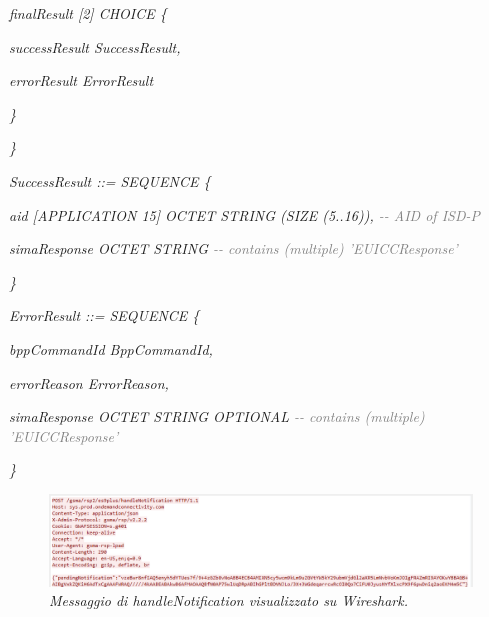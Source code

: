 \documentclass[10pt, oneside]{book}
\begin{document}
\hspace{0.75cm} \textit{finalResult [2] CHOICE \{}

\hspace{1.5cm} \textit{successResult SuccessResult,}

\hspace{1.5cm} \textit{errorResult ErrorResult}

\hspace{0.75cm} \textit{\}}

\textit{\}\\}

\textit{SuccessResult ::= SEQUENCE \{}

\hspace{0.75cm} \textit{aid [APPLICATION 15] OCTET STRING (SIZE (5..16)), \textcolor{gray}{{-}{-} AID of ISD-P}}

\hspace{0.75cm} \textit{simaResponse OCTET STRING \textcolor{gray}{{-}{-} contains (multiple) 'EUICCResponse'}}

\textit{\}\\}

\textit{ErrorResult ::= SEQUENCE \{}

\hspace{0.75cm} \textit{bppCommandId BppCommandId,}

\hspace{0.75cm} \textit{errorReason ErrorReason,}

\hspace{0.75cm} \textit{simaResponse OCTET STRING OPTIONAL \textcolor{gray}{{-}{-} contains (multiple) 'EUICCResponse'}}

\textit{\}\\}

\begin{figure}
\includegraphics[width=\linewidth]{msg7-stream-pcap.png}
\caption{\textit{Messaggio di handleNotification visualizzato su Wireshark.}}
\label{fig:msg7-stream-pcap}
\end{figure}
\end{document}
